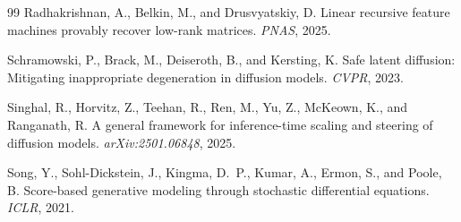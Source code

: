 \documentclass[11pt]{article}
\begin{document}
\begin{thebibliography}{99}
Radhakrishnan, A., Belkin, M., and Drusvyatskiy, D.
\newblock Linear recursive feature machines provably recover low-rank matrices.
\newblock \emph{PNAS}, 2025.

Schramowski, P., Brack, M., Deiseroth, B., and Kersting, K.
\newblock Safe latent diffusion: Mitigating inappropriate degeneration in diffusion models.
\newblock \emph{CVPR}, 2023.

Singhal, R., Horvitz, Z., Teehan, R., Ren, M., Yu, Z., McKeown, K., and Ranganath, R.
\newblock A general framework for inference-time scaling and steering of diffusion models.
\newblock \emph{arXiv:2501.06848}, 2025.

Song, Y., Sohl-Dickstein, J., Kingma, D.~P., Kumar, A., Ermon, S., and Poole, B.
\newblock Score-based generative modeling through stochastic differential equations.
\newblock \emph{ICLR}, 2021.

\end{thebibliography}
\end{document}
